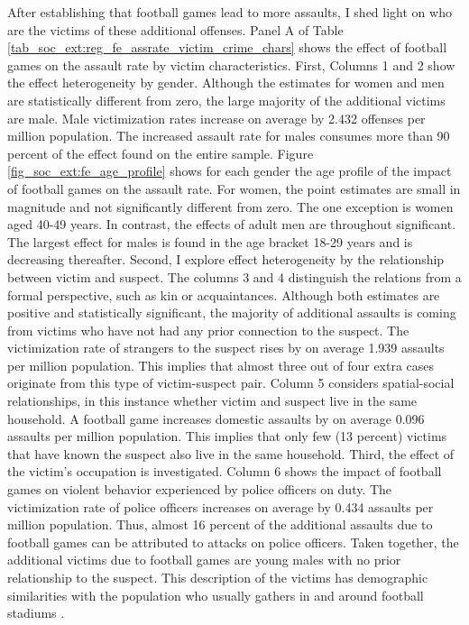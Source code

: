 After establishing that football games lead to more assaults, I shed light on who are the victims of these additional offenses. Panel A of Table \ref{tab_soc_ext:reg_fe_assrate_victim_crime_chars} shows the effect of football games on the assault rate by victim characteristics. First, Columns 1 and 2 show the effect heterogeneity by gender. Although the estimates for women and men are statistically different from zero, the large majority of the additional victims are male. Male victimization rates increase on average by 2.432 offenses per million population. The increased assault rate for males consumes more than 90 percent of the effect found on the entire sample. Figure \ref{fig_soc_ext:fe_age_profile} shows for each gender the age profile of the impact of football games on the assault rate. For women, the point estimates are small in magnitude and not significantly different from zero. The one exception is women aged 40-49 years. In contrast, the effects of adult men are throughout significant. The largest effect for males is found in the age bracket 18-29 years and is decreasing thereafter. Second, I explore effect heterogeneity by the relationship between victim and suspect. The columns 3 and 4 distinguish the relations from a formal perspective, such as kin or acquaintances. Although both estimates are positive and statistically significant, the majority of additional assaults is coming from victims who have not had any prior connection to the suspect. The victimization rate of strangers to the suspect rises by on average 1.939 assaults per million population. This implies that almost three out of four extra cases originate from this type of victim-suspect pair. Column 5 considers spatial-social relationships, in this instance whether victim and suspect live in the same household. A football game increases domestic assaults by on average 0.096 assaults per million population. This implies that only few (13 percent) victims that have known the suspect also live in the same household. Third, the effect of the victim's occupation is investigated. Column 6 shows the impact of football games on violent behavior experienced by police officers on duty. The victimization rate of police officers increases on average by 0.434 assaults per million population. Thus, almost 16 percent of the additional assaults due to football games can be attributed to attacks on police officers. Taken together, the additional victims due to football games are young males with no prior relationship to the suspect. This description of the victims has demographic similarities with the population who usually gathers in and around football stadiums \citep{pwc2016}.

